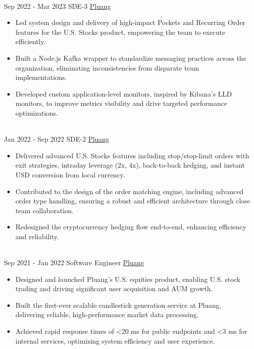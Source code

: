 \documentclass[letterpaper]{twentysecondcv} %
\begin{document}
\begin{twenty}
{\begin{itemize}
        \end{itemize}}
    \\
    \twentyitem
    	{Sep 2022 -}
		{Mar 2023}
        {SDE-3}
        {\href{https://pluang.com/}{Pluang}}
        {}
        {\begin{itemize}
        \item Led system design and delivery of high-impact Pockets and Recurring Order features for the U.S. Stocks product, empowering the team to execute efficiently.
        \item Built a Node.js Kafka wrapper to standardize messaging practices across the organization, eliminating inconsistencies from disparate team implementations.
        \item Developed custom application-level monitors, inspired by Kibana’s LLD monitors, to improve metrics visibility and drive targeted performance optimizations.
        \end{itemize}}
    \\   
    \twentyitem
   		{Jan 2022 -}
		{Sep 2022}
        {SDE-2}
        {\href{https://pluang.com}{Pluang}}
        {}
        {\begin{itemize}
        \item Delivered advanced U.S. Stocks features including stop/stop-limit orders with exit strategies, intraday leverage (2x, 4x), back-to-back hedging, and instant USD conversion from local currency.
        \item Contributed to the design of the order matching engine, including advanced order type handling, ensuring a robust and efficient architecture through close team collaboration.
        \item Redesigned the cryptocurrency hedging flow end-to-end, enhancing efficiency and reliability.
        \end{itemize}}
    \\
    \twentyitem
   		{Sep 2021 -}
		{Jan 2022}
        {Software Engineer}
        {\href{https://pluang.com/}{Pluang}}
        {}
        {\begin{itemize}
        \item Designed and launched Pluang’s U.S. equities product, enabling U.S. stock trading and driving significant user acquisition and AUM growth.
        \item Built the first-ever scalable candlestick generation service at Pluang, delivering reliable, high-performance market data processing.
        \item Achieved rapid response times of <20 ms for public endpoints and <3 ms for internal services, optimizing system efficiency and user experience.
        \end{itemize}}
    \\
\end{twenty}
\end{document}
